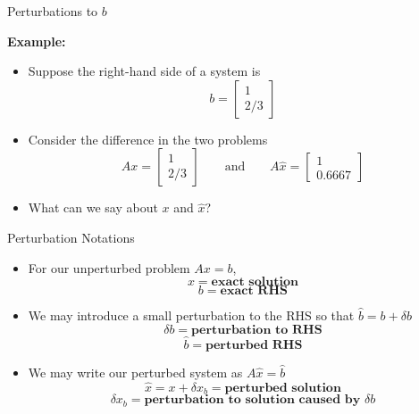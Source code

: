 \documentclass[10pt]{beamer}
\begin{document}
\begin{frame}{Perturbations to $b$}

\vspace{4mm}

\textbf{Example:}
\begin{itemize}
    \item Suppose the right-hand side of a  system is
\begin{equation*}
    b = \begin{bmatrix}1 \\ 2/3 \end{bmatrix}
\end{equation*}

\item Consider the difference in the two problems
\begin{equation*}
    Ax = \begin{bmatrix}1 \\ 2/3 \end{bmatrix}
    \ \ \ \ \ \ \ \ \
    \text{and}
    \ \ \ \ \ \ \ \ \
    A\hat{x} = \begin{bmatrix}1 \\ 0.6667 \end{bmatrix}
\end{equation*}

\item What can we say about $x$ and $\hat{x}$? 

\end{itemize}
\end{frame}
\begin{frame}{Perturbation Notations}
    \begin{itemize}
        \item For our unperturbed problem $Ax=b$, 
            $$x =  \textbf{exact solution}$$
            $$b =  \textbf{exact RHS}$$
        \item We may introduce a small perturbation to the RHS so that $\hat{b} = b + \delta b$ 
            $$\delta b =  \textbf{perturbation to RHS}$$
            $$\hat{b} =  \textbf{perturbed RHS}$$
        \item We may write our perturbed system as $A \hat{x} = \hat{b}$
            $$\hat{x} = x + \delta x_b = \textbf{perturbed solution}$$
            $$\delta x_b = \textbf{perturbation to solution caused by $\delta b$}$$
            
    \end{itemize}
\end{frame}
\end{document}
